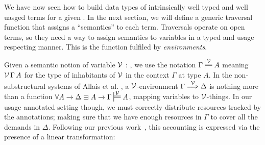 We have now seen how to build data types of intrinsically well typed
and well uasged terms for a given . In the next
section, we will define a generic traversal function that assigns a
``semantics'' to each term. Traversals operate on open terms, so they
need a way to assign semantics to variables in a typed and usage
respecting manner. This is the function fulfiled by
\emph{environments}.

Given a semantic notion of variable $\mathcal V$ : , we
use the notation $\Gamma \sdtstile{}\V A$ meaning $\mathcal V\,\Gamma\,A$ for
the type of inhabitants of $\mathcal V$ in the context $\Gamma$ at type
$A$. In the non-substructural systems of Allais et al. \cite{AACMM21},
a $\mathcal V$-environment $\Gamma \stackrel{\mathcal V}\Longrightarrow \Delta$ is nothing more than a
function $\forall A \to \Delta \sqni A \to \Gamma \sdtstile{}\V A$,
mapping variables to $\mathcal V$-things. In our usage annotated setting
though, we must correctly distribute resources tracked by the
annotations; making sure that we have enough resources in $\Gamma$ to
cover all the demands in $\Delta$. Following our previous work~\cite{WA20},
this accounting is expressed via the presence of a linear
transformation:








